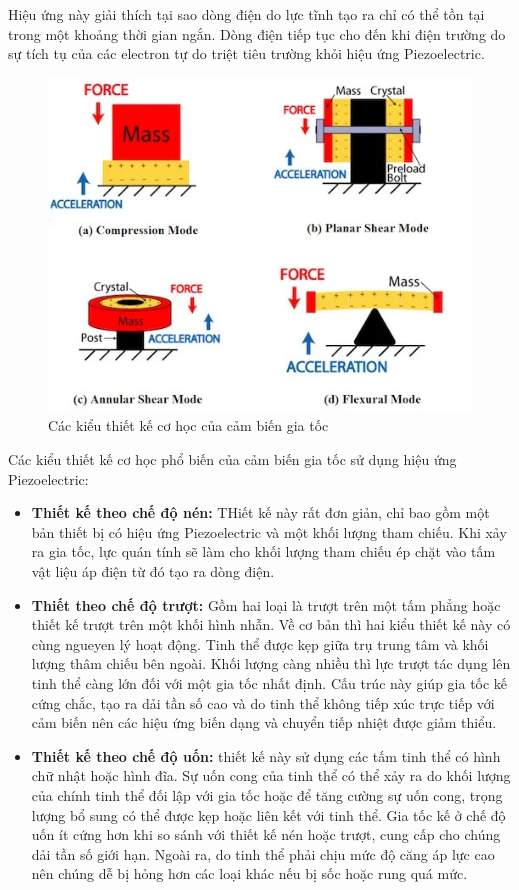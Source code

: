 \indent Hiệu ứng này giải thích tại sao dòng điện do lực tĩnh tạo ra chỉ có thể tồn tại trong một khoảng thời gian ngắn. Dòng điện tiếp tục cho đến khi điện trường do sự tích tụ của các electron tự do triệt tiêu trường khỏi hiệu ứng Piezoelectric.
\begin{figure}[H]
    \centering
    \includegraphics[width=\textwidth,height=\textheight,keepaspectratio]{Images/Theoretical basis/intro_piezo_accelerometers_figure_2.jpeg}
    \caption{Các kiểu thiết kế cơ học của cảm biến gia tốc}
    \label{fig:piozDesin}
\end{figure}
\indent Các kiểu thiết kế cơ học phổ biến của cảm biến gia tốc sử dụng hiệu ứng Piezoelectric:
\begin{itemize}
    \item \textbf{Thiết kế theo chế độ nén:} THiết kế này rất đơn giản, chỉ bao gồm một bản thiết bị có hiệu ứng Piezoelectric và một khối lượng tham chiếu. Khi xảy ra gia tốc, lực quán tính sẽ làm cho khối lượng tham chiếu ép chặt vào tấm vật liệu áp điện từ đó tạo ra dòng điện.
    \item \textbf{Thiết theo chế độ trượt:} Gồm hai loại là trượt trên một tấm phẳng hoặc thiết kế trượt trên một khối hình nhẫn. Về cơ bản thì hai kiểu thiết kế này có cùng ngueyen lý hoạt động. Tinh thể được kẹp giữa trụ trung tâm và khối lượng thâm chiếu bên ngoài. Khối lượng càng nhiều thì lực trượt tác dụng lên tinh thể càng lớn đối với một gia tốc nhất định. Cấu trúc này giúp gia tốc kế cứng chắc, tạo ra dải tần số cao và do tinh thể không tiếp xúc trực tiếp với  cảm biến nên các hiệu ứng biến dạng và chuyển tiếp nhiệt được giảm thiểu.
    \item \textbf{Thiết kế theo chế độ uốn:} thiết kế này sử dụng các tấm tinh thể có hình chữ nhật hoặc hình đĩa. Sự uốn cong của tinh thể có thể xảy ra do khối lượng của chính tinh thể đối lập với gia tốc hoặc để tăng cường sự uốn cong, trọng lượng bổ sung có thể được kẹp hoặc liên kết với tinh thể. Gia tốc kế ở chế độ uốn ít cứng hơn khi so sánh với thiết kế nén hoặc trượt, cung cấp cho chúng dải tần số giới hạn. Ngoài ra, do tinh thể phải chịu mức độ căng áp lực cao nên chúng dễ bị hỏng hơn các loại khác nếu bị sốc hoặc rung quá mức.
\end{itemize}



